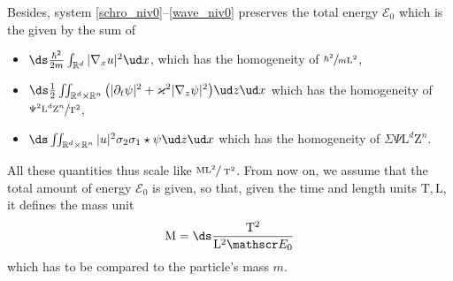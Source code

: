 \pagebreak[2]
Besides, system \eqref{schro_niv0}--\eqref{wave_niv0} preserves the total energy $\mathscr E_0$ which is the given by the sum of
\begin{itemize}
\item $\ds\frac{\hbar ^2}{2m}\int_{\mathbb R^d}|\nabla_x u |^2 \ud x$, which has the homogeneity of $\sfrac{\hbar ^2}{m \mathrm L^2}$,
\item $\ds\frac{1}{2}\iint_{\mathbb R^d\times \mathbb R^n}\big(|\partial_t \psi |^2 + \varkappa^2|\nabla_z\psi|^2\big) \ud z\ud x$
which has the homogeneity of $\sfrac{\Psi^2 \mathrm L^d\mathrm Z^n}{ \mathrm T^2}$,
\item $\ds\iint_{\mathbb R^d\times \mathbb R^n}
|u|^2 \sigma_2\sigma_1\star \psi \ud z\ud x$
which has the homogeneity of $\Sigma \Psi \mathrm L^d\mathrm Z^n$.
\end{itemize}
All these quantities thus scale like $\sfrac{ \mathrm M \mathrm L^2}{\ \mathrm T^2}$.
From now on, we
assume that the total amount of energy $\mathscr E_0$ is given, so that, given the time and length units $\mathrm T, \mathrm L$, it defines
the mass unit
\[
\mathrm M= \ds\frac{\mathrm T^2}{\mathrm L^2\mathscr E_0}
\]
which has to be compared to the particle's mass $m$.

